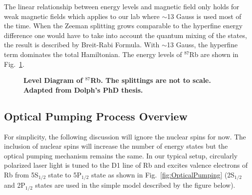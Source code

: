 The linear relationship between energy levels and magnetic field only holds for weak magnetic fields which applies to our lab where $\sim$13 Gauss is used most of the time. When the Zeeman splitting grows comparable to the hyperfine energy difference one would have to take into account the quantum mixing of the states, the result is described by Breit-Rabi Formula. With $\sim$13 Gauss, the hyperfine term dominates the total Hamiltonian. The energy levels of $^{87}$Rb are shown in Fig.~\ref{RbEnergyLevels}.

\begin{figure}[t!]
	\centering
	\caption{{\bf Level Diagram of $^{87}$Rb. The splittings are not to scale. Adapted from Dolph's PhD thesis.}}
	\label{RbEnergyLevels}
\end{figure}

\subsection{Optical Pumping Process Overview}

For simplicity, the following discussion will ignore the nuclear spins for now. The inclusion of nuclear spins will increase the number of energy states but the optical pumping mechanism remains the same. In our typical setup, circularly polarized laser light is tuned to the D1 line of Rb and excites valence electrons of Rb from 5S$_{1/2}$ state to 5P$_{1/2}$ state as shown in Fig.~\ref{fig:OpticalPumping} (2S$_{1/2}$ and 2P$_{1/2}$ states are used in the simple model described by the figure below). 


